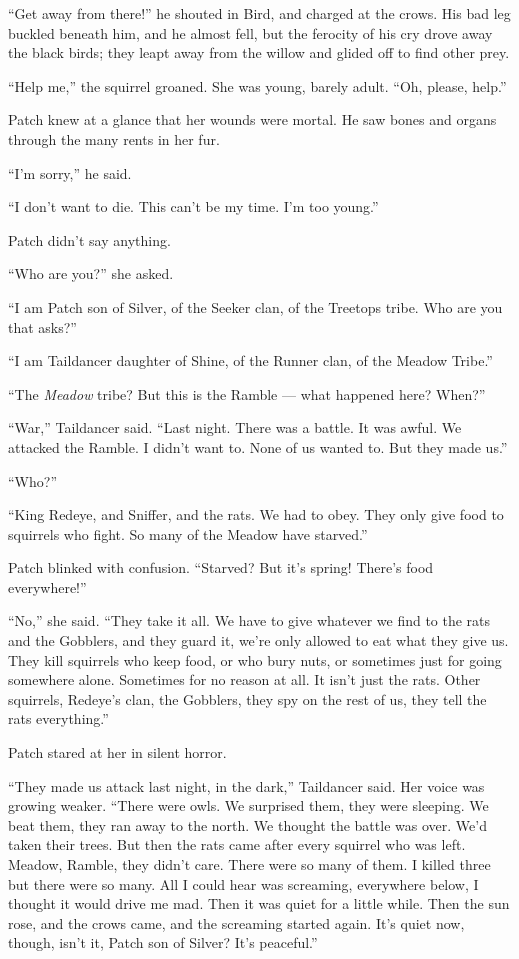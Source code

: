 \documentclass[12pt]{memoir}
\begin{document}
“Get away from there!” he shouted in Bird, and charged at the
crows. His bad leg buckled beneath him, and he almost fell, but the
ferocity of his cry drove away the black birds; they leapt away from
the willow and glided off to find other prey.

“Help me,” the squirrel groaned. She was young, barely adult. “Oh,
please, help.”

Patch knew at a glance that her wounds were mortal. He saw bones and
organs through the many rents in her fur.

“I’m sorry,” he said.

“I don’t want to die. This can’t be my time. I’m too young.”

Patch didn’t say anything.

“Who are you?” she asked.

“I am Patch son of Silver, of the Seeker clan, of the Treetops
tribe. Who are you that asks?”

“I am Taildancer daughter of Shine, of the Runner clan, of the Meadow
Tribe.”

“The \textit{Meadow} tribe? But this is the Ramble — what happened
here? When?”

“War,” Taildancer said. “Last night. There was a battle. It was
awful. We attacked the Ramble. I didn’t want to. None of us wanted
to. But they made us.”

“Who?”

“King Redeye, and Sniffer, and the rats. We had to obey. They only
give food to squirrels who fight. So many of the Meadow have starved.”

Patch blinked with confusion. “Starved? But it’s spring! There’s food
everywhere!”

“No,” she said. “They take it all. We have to give whatever we find to
the rats and the Gobblers, and they guard it, we’re only allowed to
eat what they give us. They kill squirrels who keep food, or who bury
nuts, or sometimes just for going somewhere alone. Sometimes for no
reason at all. It isn’t just the rats. Other squirrels, Redeye’s clan,
the Gobblers, they spy on the rest of us, they tell the rats
everything.”

Patch stared at her in silent horror.

“They made us attack last night, in the dark,” Taildancer said. Her
voice was growing weaker. “There were owls. We surprised them, they
were sleeping. We beat them, they ran away to the north. We thought
the battle was over. We’d taken their trees. But then the rats came
after every squirrel who was left. Meadow, Ramble, they didn’t
care. There were so many of them. I killed three but there were so
many. All I could hear was screaming, everywhere below, I thought it
would drive me mad. Then it was quiet for a little while. Then the sun
rose, and the crows came, and the screaming started again. It’s quiet
now, though, isn’t it, Patch son of Silver? It’s peaceful.”
\end{document}
